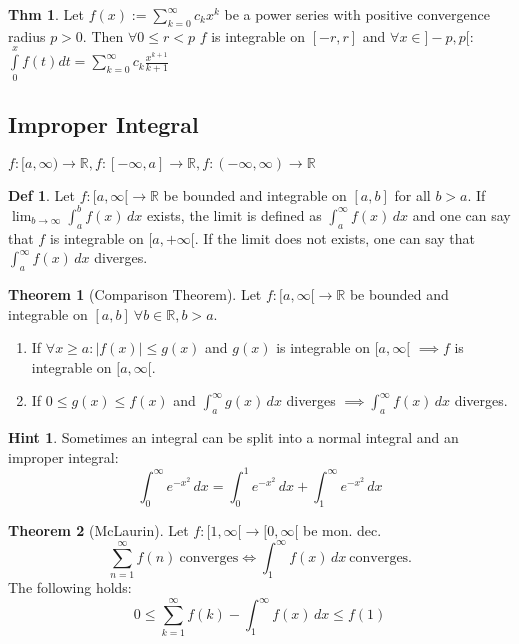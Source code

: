 \documentclass[a4paper, 10pt]{article}
\theoremstyle{definition}
\newtheorem*{theorem}{Thm}
\newtheorem*{definition}{Def}
\newtheorem*{note_wrapper}{Hint}
\theoremstyle{ex}
\theoremstyle{named}
\newtheorem*{ntheorem_wrapper}{Theorem}
\newenvironment{ntheorem}%
    {\begin{mdframed}[style=important]\begin{ntheorem_wrapper}}%
    {\end{ntheorem_wrapper}\end{mdframed}}
\newenvironment{note}%
    {\begin{mdframed}[style=trick]\begin{note_wrapper}}%
    {\end{note_wrapper}\end{mdframed}}
\newcommand{\R}{\mathbb{R}}
\begin{document}
\begin{theorem}
    Let $f(x) := \sum_{k=0}^\infty c_k x^k$ be a power series with positive convergence radius $p > 0$. Then $\forall 0 \leq r < p$ $f$ is integrable on $[-r, r]$ and $\forall x \in ]-p, p[$:
    $\int\limits_0^x f(t) dt = \sum\limits_{k=0}^\infty c_k \frac{x^{k + 1}}{k + 1}$
\end{theorem}

\subsection{Improper Integral}
\begin{center}
    $f: [a, \infty) \to \R, f: [-\infty, a] \to \R, f: (-\infty, \infty) \to \R$
\end{center}

\begin{definition}
    Let $f: [a, \infty[ \to \R$ be bounded and integrable on $[a, b]$ for all $b > a$. If $\lim_{b \to \infty} \int_a^b f(x) \,dx$ exists, the limit is defined as $\int_a^\infty f(x) \,dx$ and one can say that $f$ is integrable on $[a, +\infty[$. If the limit does not exists, one can say that $\int_a^\infty f(x) \,dx$ diverges.
\end{definition}

\begin{ntheorem}[Comparison Theorem]
    Let $f: [a, \infty[ \to \R$ be bounded and integrable on $[a, b] \ \forall b \in \R, b > a$.
    \begin{enumerate}
        \item If $\forall x \geq a : |f(x)| \leq g(x)$ and $g(x)$ is integrable on $[a, \infty[$ $\implies f$ is integrable on $[a, \infty[$.
        \item If $0 \leq g(x) \leq f(x)$ and $\int_a^\infty g(x) \,dx$ diverges $\implies \int_a^\infty f(x) \,dx$ diverges.
    \end{enumerate}
\end{ntheorem}

\begin{note}
    Sometimes an integral can be split into a normal integral and an improper integral:
    $$\int_0^\infty e^{-x^2} \,dx = \int_0^1 e^{-x^2} \,dx + \int_1^\infty e^{-x^2} \,dx$$
\end{note}

\begin{ntheorem}[McLaurin]
    Let $f: [1, \infty[ \to [0, \infty[$ be mon. dec.
    $$\sum_{n=1}^\infty f(n) \ \text{converges} \iff \int_1^\infty f(x) \,dx \ \text{converges}.$$ 
    The following holds:
    $$0 \leq \sum_{k=1}^\infty f(k) - \int_1^\infty f(x) \,dx \leq f(1)$$
\end{ntheorem}
\end{document}
